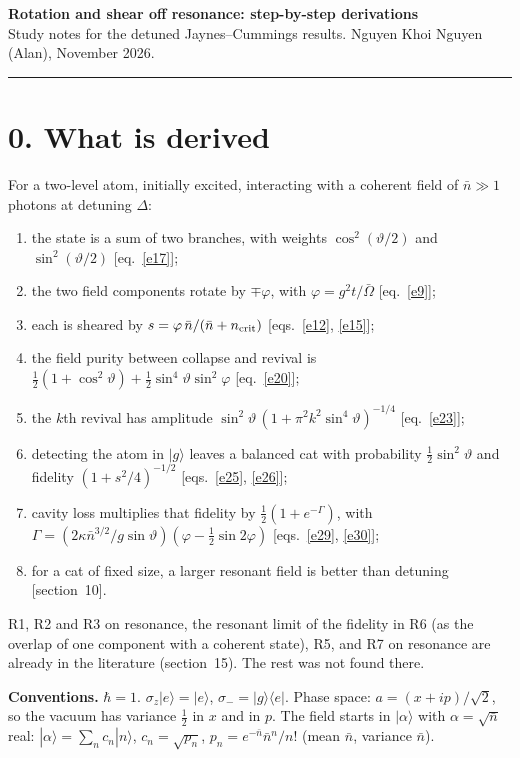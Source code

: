 \documentclass[11pt,letterpaper]{article}
\newcommand{\nbar}{\bar{n}}
\newcommand{\ncrit}{n_{\rm crit}}
\newcommand{\Obar}{\bar{\Omega}}
\newcommand{\ket}[1]{|#1\rangle}
\newcommand{\bra}[1]{\langle#1|}
\begin{document}
{\Large\bfseries Rotation and shear off resonance: step-by-step derivations}\\[4pt]
Study notes for the detuned Jaynes--Cummings results. Nguyen Khoi Nguyen (Alan), November 2026.

\rule{\textwidth}{0.4pt}

\section*{0. What is derived}
For a two-level atom, initially excited, interacting with a coherent field of $\nbar\gg1$ photons at
detuning $\Delta$:
\begin{enumerate}[nosep,leftmargin=2em,label=R\arabic*.]
\item the state is a sum of two branches, with weights $\cos^2(\vartheta/2)$ and $\sin^2(\vartheta/2)$ [eq.~\eqref{e17}];
\item the two field components rotate by $\mp\varphi$, with $\varphi = g^2t/\Obar$ [eq.~\eqref{e9}];
\item each is sheared by $s = \varphi\,\nbar/(\nbar+\ncrit)$ [eqs.~\eqref{e12}, \eqref{e15}];
\item the field purity between collapse and revival is $\tfrac12(1+\cos^2\vartheta)+\tfrac12\sin^4\vartheta\sin^2\varphi$ [eq.~\eqref{e20}];
\item the $k$th revival has amplitude $\sin^2\vartheta\,(1+\pi^2k^2\sin^4\vartheta)^{-1/4}$ [eq.~\eqref{e23}];
\item detecting the atom in $\ket{g}$ leaves a balanced cat with probability $\tfrac12\sin^2\vartheta$ and
      fidelity $(1+s^2/4)^{-1/2}$ [eqs.~\eqref{e25}, \eqref{e26}];
\item cavity loss multiplies that fidelity by $\tfrac12(1+e^{-\Gamma})$, with
      $\Gamma = (2\kappa\nbar^{3/2}/g\sin\vartheta)(\varphi-\tfrac12\sin2\varphi)$ [eqs.~\eqref{e29}, \eqref{e30}];
\item for a cat of fixed size, a larger resonant field is better than detuning [section~10].
\end{enumerate}
R1, R2 and R3 on resonance, the resonant limit of the fidelity in R6 (as the overlap of one component
with a coherent state), R5, and R7 on resonance are already in the literature (section~15). The rest was
not found there.

\textbf{Conventions.} $\hbar=1$. $\sigma_z\ket{e}=\ket{e}$, $\sigma_-=\ket{g}\bra{e}$. Phase space:
$a=(x+ip)/\sqrt2$, so the vacuum has variance $\tfrac12$ in $x$ and in $p$. The field starts in
$\ket{\alpha}$ with $\alpha=\sqrt{\nbar}$ real: $\ket{\alpha}=\sum_n c_n\ket{n}$,
$c_n=\sqrt{p_n}$, $p_n=e^{-\nbar}\nbar^n/n!$ (mean $\nbar$, variance $\nbar$).
\end{document}
